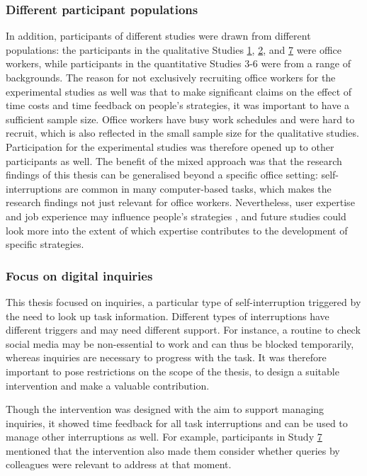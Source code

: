 \subsubsection{Different participant populations}
In addition, participants of different studies were drawn from different populations: the participants in the qualitative Studies \hyperref[st:Study1]{1}, \hyperref[st:Study2]{2}, and \hyperref[st:Study7]{7} were office workers, while participants in the quantitative Studies 3-6 were from a range of backgrounds. The reason for not exclusively recruiting office workers for the experimental studies as well was that to make significant claims on the effect of time costs and time feedback on people's strategies, it was important to have a sufficient sample size. Office workers have busy work schedules and were hard to recruit, which is also reflected in the small sample size for the qualitative studies. Participation for the experimental studies was therefore opened up to other participants as well. The benefit of the mixed approach was that the research findings of this thesis can be generalised beyond a specific office setting: self-interruptions are common in many computer-based tasks, which makes the research findings not just relevant for office workers. Nevertheless, user expertise and job experience may influence people's strategies \citep{Weir2007}, and future studies could look more into the extent of which expertise contributes to the development of specific strategies. 

\subsubsection{Focus on digital inquiries}
This thesis focused on inquiries, a particular type of self-interruption triggered by the need to look up task information. Different types of interruptions have different triggers and may need different support. For instance, a routine to check social media may be non-essential to work and can thus be blocked temporarily, whereas inquiries are necessary to progress with the task. It was therefore important to pose restrictions on the scope of the thesis, to design a suitable intervention and make a valuable contribution. 

Though the intervention was designed with the aim to support managing inquiries, it showed time feedback for all task interruptions and can be used to manage other interruptions as well. For example, participants in Study \hyperref[st:Study7]{7} mentioned that the intervention also made them consider whether queries by colleagues were relevant to address at that moment.

